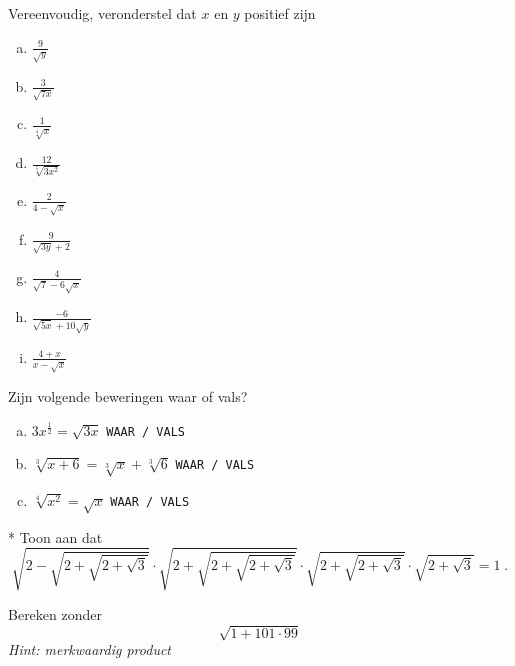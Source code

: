 \documentclass[12pt,twoside]{article}
\begin{document}
\begin{oefening}
  Vereenvoudig, veronderstel dat $x$ en $y$ positief zijn
  \begin{multicols}{3}
    \begin{enumerate}[(a)]
      \itemsep1em
    \item \(\displaystyle \frac{9}{{\sqrt y }}\)
    \item \(\displaystyle \frac{3}{{\sqrt {7x} }}\)
    \item \(\displaystyle \frac{1}{{\sqrt[4]{x}}}\)
    \item \(\displaystyle \frac{{12}}{{\sqrt[5]{{3{x^2}}}}}\)
    \item \(\displaystyle \frac{2}{{4 - \sqrt x }}\)
    \item \(\displaystyle \frac{9}{{\sqrt {3y} + 2}}\)
    \item \(\displaystyle \frac{4}{{\sqrt 7 - 6\sqrt x }}\)
    \item \(\displaystyle \frac{{ - 6}}{{\sqrt {5x} + 10\sqrt y }}\)
    \item \(\displaystyle \frac{{4 + x}}{{x - \sqrt x }}\)
    \end{enumerate}
  \end{multicols}
\end{oefening}

\begin{oefening}
  Zijn volgende beweringen waar of vals?
  \begin{enumerate}[(a)]
    \itemsep1em
  \item $3{x^{\frac{1}{2}}} = \sqrt {3x}$ \hfill \texttt{WAAR / VALS}\mbox{\hspace{5cm}}
  \item $\sqrt[3]{{x + 6}} = \sqrt[3]{x} + \sqrt[3]{6}$ \hfill \texttt{WAAR / VALS}\mbox{\hspace{5cm}}
  \item $\sqrt[4]{{{x^2}}} = \sqrt x$ \hfill \texttt{WAAR / VALS}\mbox{\hspace{5cm}}
  \end{enumerate}
\end{oefening}

\begin{oefening}*
Toon aan dat
$$\sqrt{2-\sqrt{2+\sqrt{2+\sqrt{3}}}}\cdot\sqrt{2+\sqrt{2+\sqrt{2+\sqrt{3}}}}\cdot\sqrt{2+\sqrt{2+\sqrt{3}}}\cdot\sqrt{2+\sqrt{3}} = 1\;.$$
\end{oefening}

\begin{oefening}
Bereken zonder 
$$\sqrt{1+101\cdot99}$$
{\em Hint: merkwaardig product}
\end{oefening}
\end{document}
